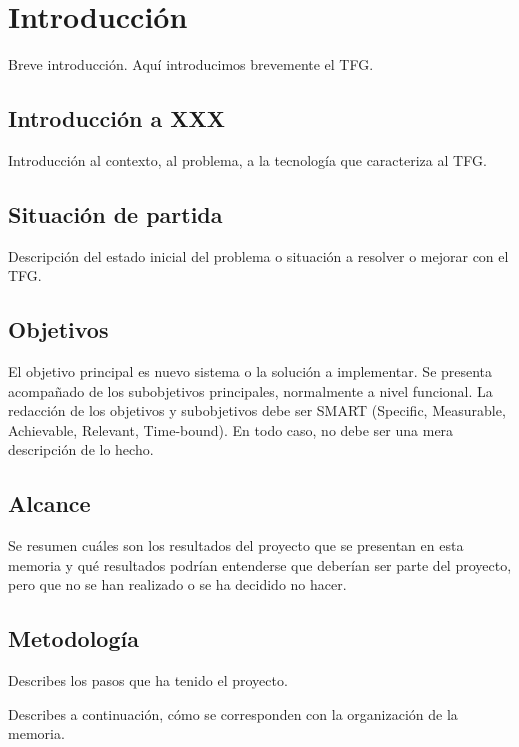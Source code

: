 \documentclass[a4paper,12pt]{report}
\begin{document}
\newpage
{}
\setcounter{page}{1}


\chapter{Introducción}

Breve introducción. Aquí introducimos brevemente el TFG. 

\section{Introducción a XXX}

Introducción al contexto, al problema, a la tecnología que caracteriza al TFG.

\section{Situación de partida}

Descripción del estado inicial del problema o situación a resolver o mejorar con el TFG.

\section{Objetivos}

El objetivo principal es nuevo sistema o la solución a implementar. 
Se presenta acompañado de los subobjetivos principales, normalmente a nivel funcional.
La redacción de los objetivos y subobjetivos debe ser SMART (Specific, Measurable, Achievable, Relevant, Time-bound).
En todo caso, no debe ser una mera descripción de lo hecho. 

\section{Alcance}

Se resumen cuáles son los resultados del proyecto que se presentan en esta memoria 
y qué resultados podrían entenderse que deberían ser parte del proyecto, pero que 
no se han realizado o se ha decidido no hacer.

\section{Metodología}

Describes los pasos que ha tenido el proyecto.

Describes a continuación, 
cómo se corresponden con la organización de la memoria.
\end{document}
